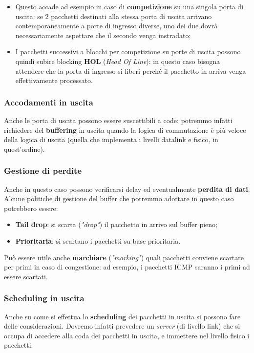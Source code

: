 \documentclass[a4paper,11pt]{article}
\begin{document}
\begin{itemize}
	\item Questo accade ad esempio in caso di \textbf{competizione} su una singola porta di uscita: se 2 pacchetti destinati alla stessa porta di uscita arrivano contemporaneamente a porte di ingresso diverse, uno dei due dovrà necessariamente aspettare che il secondo venga instradato;
	\item I pacchetti successivi a blocchi per competizione su porte di uscita possono quindi subire blocking \textbf{HOL} (\textit{Head Of Line}): in questo caso bisogna attendere che la porta di ingresso si liberi perché il pacchetto in arriva venga effettivamente processato.
\end{itemize}

\subsubsection{Accodamenti in uscita}
Anche le porta di uscita possono essere suscettibili a code: potremmo infatti richiedere del \textbf{buffering} in uscita quando la logica di commutazione è più veloce della logica di uscita (quella che implementa i livelli datalink e fisico, in quest'ordine).

\subsubsection{Gestione di perdite}
Anche in questo caso possono verificarsi delay ed eventualmente \textbf{perdita di dati}.
Alcune politiche di gestione del buffer che potremmo adottare in questo caso potrebbero essere:
\begin{itemize}
	\item \textbf{Tail drop}: si scarta (\textit{"drop"}) il pacchetto in arrivo sul buffer pieno;
	\item \textbf{Prioritaria}: si scartano i pacchetti su base prioritaria.
\end{itemize}

Può essere utile anche \textbf{marchiare} (\textit{"marking"}) quali pacchetti conviene scartare per primi in caso di congestione: ad esempio, i pacchetti ICMP saranno i primi ad essere scartati.

\subsubsection{Scheduling in uscita}
Anche su come si effettua lo \textbf{scheduling} dei pacchetti in uscita si possono fare delle considerazioni.
Dovremo infatti prevedere un \textit{server} (di livello link) che si occupa di accedere alla coda dei pacchetti in uscita, e immettere nel livello fisico i pacchetti.
\end{document}
